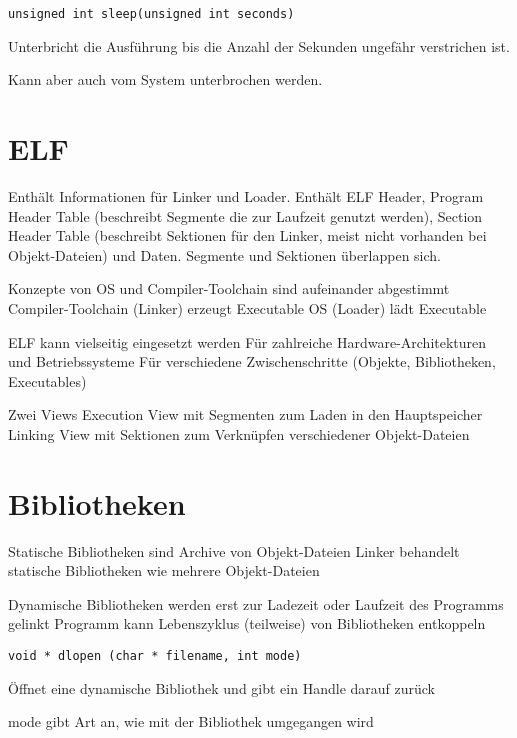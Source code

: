\begin{multicols*}{5}
	\vspace{-5pt}		

	\begin{lstlisting}
unsigned int sleep(unsigned int seconds)
	\end{lstlisting}
	\vspace{-5pt}
	\begin{compactitem}[$\bullet$]
		\item Unterbricht die Ausführung bis die Anzahl der Sekunden ungefähr verstrichen ist. 
		\item Kann aber auch vom System unterbrochen werden.	
	\end{compactitem}
	
	
	
	
	


	
\columnbreak


\section{ELF}

Enthält Informationen für Linker und Loader. 
Enthält ELF Header, Program Header Table (beschreibt Segmente die zur Laufzeit genutzt werden),
Section Header Table (beschreibt Sektionen für den Linker, meist nicht vorhanden bei Objekt-Dateien) und Daten.
Segmente und Sektionen überlappen sich.

Konzepte von OS und Compiler-Toolchain sind aufeinander abgestimmt
Compiler-Toolchain (Linker) erzeugt Executable
OS (Loader) lädt Executable 

ELF kann vielseitig eingesetzt werden
Für zahlreiche Hardware-Architekturen und Betriebssysteme
Für verschiedene Zwischenschritte (Objekte, Bibliotheken, Executables) 

Zwei Views
Execution View mit Segmenten zum Laden in den Hauptspeicher
Linking View mit Sektionen zum Verknüpfen verschiedener Objekt-Dateien

\vspace{-6pt}
\section{Bibliotheken}

Statische Bibliotheken sind Archive von Objekt-Dateien
Linker behandelt statische Bibliotheken wie mehrere Objekt-Dateien




Dynamische Bibliotheken werden erst zur Ladezeit oder Laufzeit des Programms gelinkt
Programm kann Lebenszyklus (teilweise) von Bibliotheken entkoppeln
\vspace{-6pt}
\begin{lstlisting}
void * dlopen (char * filename, int mode)
\end{lstlisting}
\vspace{-6pt}
	\begin{compactitem}[$\bullet$]
		\item Öffnet eine dynamische Bibliothek und gibt ein Handle darauf zurück
		\item mode gibt Art an, wie mit der Bibliothek umgegangen wird
	\end{compactitem}



\end{multicols*}

